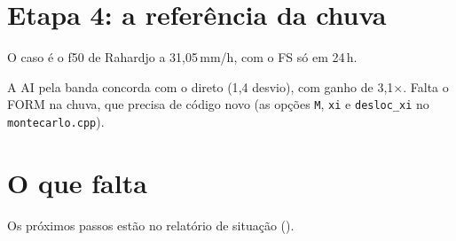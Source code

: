 \documentclass[11pt,a4paper]{article}
\begin{document}
\section{Etapa 4: a referência da chuva}\label{sec:chuva}
O caso é o f50 de Rahardjo a 31,05\,mm/h, com o FS só em 24\,h.
\begin{table}[H]\centering\small
{}
\caption{Chuva: o Monte Carlo direto de 10\,000 é a referência para validar o
FORM e a AI na chuva (etapa 4).}\label{tab:chuva}
\end{table}
A AI pela banda concorda com o direto (1{,}4 desvio), com ganho de 3{,}1$\times$. Falta o FORM na chuva, que precisa de código novo (as opções \texttt{M},
\texttt{xi} e \texttt{desloc\_xi} no \texttt{montecarlo.cpp}).

\section{O que falta}
Os próximos passos estão no relatório de situação ().
\end{document}
